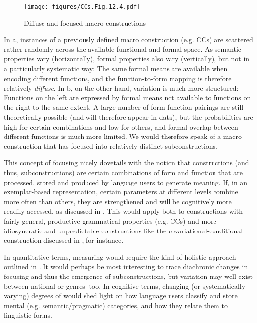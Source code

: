 \begin{figure}
\texttt{[image: figures/CCs.Fig.12.4.pdf]}
\caption{\label{bkm:Ref502692541}\label{fig:12.4}Diffuse and focused macro constructions}
 \end{figure}

In a, instances of a previously defined macro construction (e.g. CCs) are scattered rather randomly across the available functional and formal space. As semantic properties vary (horizontally), formal properties also vary (vertically), but not in a particularly systematic way: The same formal means are available when encoding different functions, and the function-to-form mapping is therefore relatively \textit{diffuse}. In b, on the other hand, variation is much more structured: Functions on the left are expressed by formal means not available to functions on the right to the same extent. A large number of form-function pairings are still theoretically possible (and will therefore appear in data), but the probabilities are high for certain combinations and low for others, and formal overlap between different functions is much more limited. We would therefore speak of a macro construction that has focused into relatively distinct subconstructions.

This concept of focusing nicely dovetails with the notion that constructions (and thus, subconstructions) are certain combinations of form and function that are processed, stored and produced by language users to generate meaning. If, in an exemplar-based representation, certain parameters at different levels combine more often than others, they are strengthened and will be cognitively more readily accessed, as discussed in . This would apply both to constructions with fairly general, productive grammatical properties (e.g. CCs) and more idiosyncratic and unpredictable constructions like the covariational-conditional construction discussed in , for instance.

In quantitative terms, measuring  would require the kind of holistic approach outlined in . It would perhaps be most interesting to trace diachronic changes in focusing and thus the emergence of subcon\-struc\-tions, but variation may well exist between national  or genres, too. In cognitive terms, changing (or systematically varying) degrees of  would shed light on how language users classify and store mental (e.g. semantic/pragmatic) categories, and how they relate them to linguistic forms.

